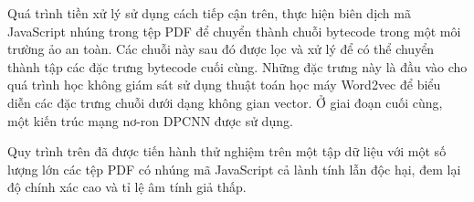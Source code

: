 \documentclass[./../main.tex]{subfiles}
\begin{document}
Quá trình tiền xử lý sử dụng cách tiếp cận trên, thực hiện biên dịch mã JavaScript nhúng trong tệp PDF để chuyển thành chuỗi bytecode trong một môi trường ảo an toàn. Các chuỗi này sau đó được lọc và xử lý để có thể chuyển thành tập các đặc trưng bytecode cuối cùng. Những đặc trưng này là đầu vào cho quá trình học không giám sát sử dụng thuật toán học máy Word2vec để biểu diễn các đặc trưng chuỗi dưới dạng không gian vector. Ở giai đoạn cuối cùng, một kiến trúc mạng nơ-ron DPCNN \cite{dpcnn} được sử dụng.

Quy trình trên đã được tiến hành thử nghiệm trên một tập dữ liệu với một số lượng lớn các tệp PDF có nhúng mã JavaScript cả lành tính lẫn độc hại, đem lại độ chính xác cao và tỉ lệ âm tính giả thấp.
\end{document}
